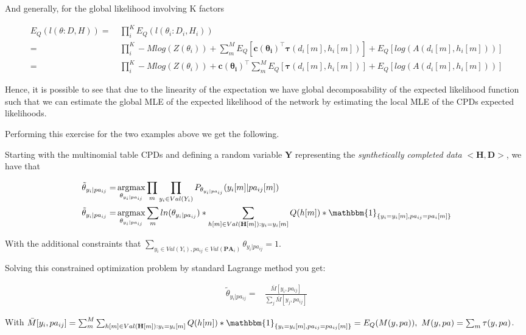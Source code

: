 \documentclass[11pt]{article}
\begin{document}
\begin{article}
And generally, for the global likelihood involving K factors

\begin{align} \label{eq:global-likelihood}
E_Q(l(\theta :D, H)) =& \ \prod_i^K E_Q(l(\theta_i :D_i, H_i)) \nonumber \\
               =& \ \prod_i^K - Mlog(Z(\theta_i)) + \sum_m^M E_Q[\mathbf{c(\theta_i)}^\intercal \mathbf{\tau}(d_i[m], h_i[m])] + E_Q[log(A(d_i[m], h_i[m]))] \\
               =& \ \prod_i^K - Mlog(Z(\theta_i)) + \mathbf{c(\theta_i)}^\intercal \sum_m^M E_Q[\mathbf{\tau}(d_i[m], h_i[m])] + E_Q[log(A(d_i[m], h_i[m]))] \nonumber  
\end{align}

Hence, it is possible to see that due to the linearity of the
expectation we have global decomposability of the expected
likelihood function such that we can estimate the global MLE of
the expected likelihood of the network by estimating the local MLE
of the CPDs expected likelihoods.

Performing this exercise for the two examples above we get the
following.

Starting with the multinomial table CPDs and defining a random
variable \(\textbf{Y}\) representing the \emph{synthetically completed
data} \(<\textbf{H}, \textbf{D}>\), we have that

\begin{align} \label{eq:solution}
\tilde{\theta}_{y_i | pa_{ij}} =& \operatorname*{argmax}_{\theta_{y_i | pa_{ij}}}  \prod_m \prod_{y_i \in Val(Y_i)} P_{\theta_{y_i|pa_{ij}}}(y_i[m]|pa_{ij}[m]) \nonumber  \\
\tilde{\theta}_{y_i | pa_{ij}} =& \operatorname*{argmax}_{\theta_{y_i | pa_{ij}}} \sum_m ln(\theta_{y_i | pa_{ij}}) * \sum_{h[m] \in Val(\textbf{H}[m]) : y_i = y_i[m]} Q(h[m]) * \mathbbm{1}_{\{y_i = y_i[m], pa_{ij} = pa_i[m]\}}
\end{align}

With the additional constraints that \(\sum_{y_i \in Val(Y_i), pa_{ij}
     \in Val(\textbf{PA}_i)} \theta_{y_i | pa_{ij}} = 1\).

Solving this constrained optimization problem by standard
Lagrange method you get: 

\begin{align} \label{eq:solution}
\tilde{\theta}_{y_i | pa_{ij}} =& \frac{\bar{M}[y_i, pa_{ij}]}{\sum_j \bar{M}[y_j, pa_{ij}]}
\end{align}

With \(\bar{M}[y_i, pa_{ij}] = \sum_m^M \sum_{h[m] \in
     Val(\textbf{H}[m]): y_i = y_i[m]} Q(h[m]) * \mathbbm{1}_{\{y_i = y_i[m], pa_{ij} =
     pa_{ij}[m]\}} = E_Q(M(y, pa)), \ M(y, pa) = \sum_m \tau(y,pa)\).


\end{article}
\end{document}
